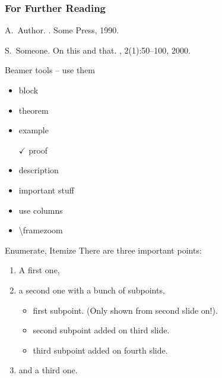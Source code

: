 \begin{frame}[allowframebreaks]
  \frametitle<presentation>{For Further Reading}
    
  \begin{thebibliography}{10}
    
  \beamertemplatebookbibitems

    A.~Author.
    .
    \newblock Some Press, 1990.
 
    
  \beamertemplatearticlebibitems

    S.~Someone.
    \newblock On this and that.
    , 2(1):50–100,
    2000.
  \end{thebibliography}
\end{frame}

\begin{frame}{Beamer tools – use them}
  \begin{itemize}
  \item block
  \item theorem
  \item<2> example
  \item[$\checkmark$] proof
  \item description
  \item \alert{important stuff}
  \item use columns
  \item \textbackslash{}framezoom
  \end{itemize}
\end{frame}


\begin{frame}{Enumerate, Itemize}
  There are three important points:
  \begin{enumerate}
    \item<1-> A first one,
    \item<2-> a second one with a bunch of subpoints,
  \begin{itemize}
    \item first subpoint. (Only shown from second slide on!).
    \item<3-> second subpoint added on third slide.
    \item<4-> third subpoint added on fourth slide.
  \end{itemize}
    \item<5-> and a third one.
  \end{enumerate}
\end{frame}


